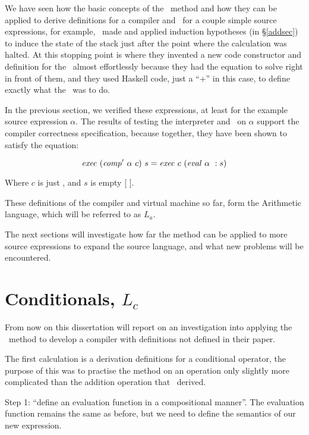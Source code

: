 \documentclass {article}
\begin{document}
We have seen how the basic concepts of the \BH\ method and
how they can be applied to derive definitions
for a compiler and \vm\ for a couple simple source 
expressions, for example, \BH\ made and applied induction
hypotheses (in \S\ref{addsec}) to induce 
the state of the stack just after the
point where the calculation was halted.
At this stopping point is where 
they invented a new code constructor and 
definition for the \vm\
almost effortlessly because they had the equation
to solve right in front of them, and they
used Haskell code, just a ``+'' in this case, 
to define exactly what the \vm\ was to do.

In the previous section, we verified these expressions, 
at least for the example source expression $\alpha$.
The results of testing the interpreter and \vm\ on $\alpha$
 support the compiler correctness specification,
because together, they have been shown to satisfy the equation:

\[ \Exec (\Compp \alpha\ c)\ s = \Exec c\ (\evalf \alpha\ : s) \]

\noindent Where $c$ is just \HALTt, and $s$ is empty [ ].

These definitions of the compiler and virtual machine so far,
form the Arithmetic language, which will be referred to as $L_a$.

The next sections will investigate how 
far the method can be applied to
more source expressions to expand the source language,
and what new problems will be encountered.



\pagebreak
\section{Conditionals, $L_c$} \label{langcond}

From now on this dissertation will report on an
investigation into applying the \BH\ method to develop a compiler
with definitions not defined in their paper\cite{bandh}.

The first calculation is a derivation
definitions for a conditional operator,
the purpose of this was to practise the method
on an operation only slightly more complicated than
the addition operation that \BH\ derived.

\newcommand{\ite}{\textit{Ite}}
\newcommand{\Ite}{\mathit{Ite\ }}
\newcommand{\String}{\mathit{String\ }}

Step 1: 
``define an evaluation function in a compositional manner''.
The evaluation function remains 
the same as before,
but we need to define 
the semantics of our new expression.
\end{document}
